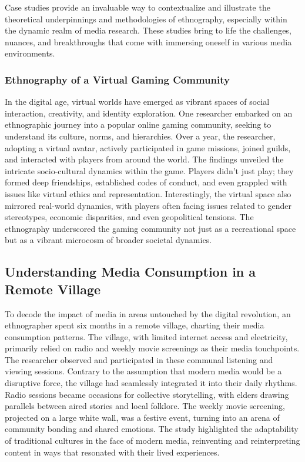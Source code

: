 \documentclass[
  b5paper]{book}
\begin{document}
Case studies provide an invaluable way to contextualize and illustrate the theoretical underpinnings and methodologies of ethnography, especially within the dynamic realm of media research. These studies bring to life the challenges, nuances, and breakthroughs that come with immersing oneself in various media environments.

\hypertarget{ethnography-of-a-virtual-gaming-community}{%
\subsubsection*{Ethnography of a Virtual Gaming Community}\label{ethnography-of-a-virtual-gaming-community}}

In the digital age, virtual worlds have emerged as vibrant spaces of social interaction, creativity, and identity exploration. One researcher embarked on an ethnographic journey into a popular online gaming community, seeking to understand its culture, norms, and hierarchies. Over a year, the researcher, adopting a virtual avatar, actively participated in game missions, joined guilds, and interacted with players from around the world. The findings unveiled the intricate socio-cultural dynamics within the game. Players didn't just play; they formed deep friendships, established codes of conduct, and even grappled with issues like virtual ethics and representation. Interestingly, the virtual space also mirrored real-world dynamics, with players often facing issues related to gender stereotypes, economic disparities, and even geopolitical tensions. The ethnography underscored the gaming community not just as a recreational space but as a vibrant microcosm of broader societal dynamics.

\hypertarget{understanding-media-consumption-in-a-remote-village}{%
\subsection*{Understanding Media Consumption in a Remote Village}\label{understanding-media-consumption-in-a-remote-village}}

To decode the impact of media in areas untouched by the digital revolution, an ethnographer spent six months in a remote village, charting their media consumption patterns. The village, with limited internet access and electricity, primarily relied on radio and weekly movie screenings as their media touchpoints. The researcher observed and participated in these communal listening and viewing sessions. Contrary to the assumption that modern media would be a disruptive force, the village had seamlessly integrated it into their daily rhythms. Radio sessions became occasions for collective storytelling, with elders drawing parallels between aired stories and local folklore. The weekly movie screening, projected on a large white wall, was a festive event, turning into an arena of community bonding and shared emotions. The study highlighted the adaptability of traditional cultures in the face of modern media, reinventing and reinterpreting content in ways that resonated with their lived experiences.
\end{document}
